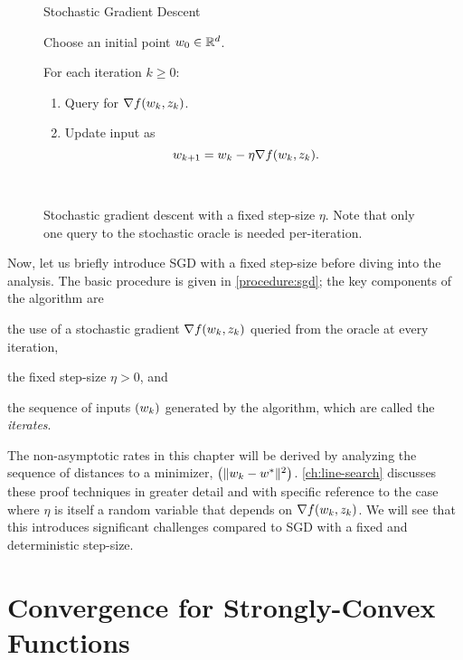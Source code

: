 \begin{figure}[t]
\begin{procedure}{Stochastic Gradient Descent}
\item Choose an initial point \( w_0 \in \mathbb{R}^d \).
\item For each iteration \( k \geq 0 \):
    \begin{enumerate}
        \item Query \oracle{} for \( \nabla f(w_k, z_{k}) \).
        \item Update input as\vspace{-1ex}%
            \[ w_{k+1} = w_k - \eta \nabla f(w_k, z_{k}). \]
    \end{enumerate}
\end{procedure}
\caption{Stochastic gradient descent with a fixed step-size \( \eta \). Note that only one query to the stochastic oracle is needed per-iteration.}~\label{procedure:sgd}
\end{figure}

Now, let us briefly introduce \ac{SGD} with a fixed step-size before diving into the analysis.
The basic procedure is given in \autoref{procedure:sgd}; the key components of the algorithm are %
\begin{inparaenum}[(i)] 
    \item the use of a stochastic gradient \( \nabla f(w_k, z_{k}) \) queried from the oracle at every iteration,
    \item the fixed step-size \( \eta > 0 \), and
    \item the sequence of inputs \( \left(w_k\right) \) generated by the algorithm, which are called the \emph{iterates}. 
\end{inparaenum}
The non-asymptotic rates in this chapter will be derived by analyzing the sequence of distances to a minimizer, \( \left(\|w_k - w^*\|^2\right) \). 
\autoref{ch:line-search} discusses these proof techniques in greater detail and with specific reference to the case where \( \eta \) is itself a random variable that depends on \( \nabla f(w_k, z_{k}) \).
We will see that this introduces significant challenges compared to \ac{SGD} with a fixed and deterministic step-size.\\

\section{Convergence for Strongly-Convex Functions}~\label{sec:sgd-sc}

